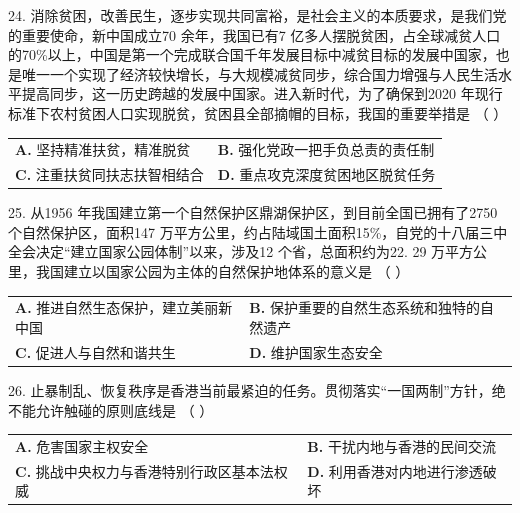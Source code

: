 \documentclass[UTF8,11pt]{ctexart}
\begin{document}
24. 消除贫困，改善民生，逐步实现共同富裕，是社会主义的本质要求，是我们党的重要使命，新中国成立70 余年，我国已有7 亿多人摆脱贫困，占全球减贫人口的70\%以上，中国是第一个完成联合国千年发展目标中减贫目标的发展中国家，也是唯一一个实现了经济较快增长，与大规模减贫同步，综合国力增强与人民生活水平提高同步，这一历史跨越的发展中国家。进入新时代，为了确保到2020 年现行标准下农村贫困人口实现脱贫，贫困县全部摘帽的目标，我国的重要举措是 （    ）


\begin{center}\begin{tabular}{>{\raggedright\arraybackslash}p{\dimexpr(\linewidth-4\tabcolsep)/2\relax}>{\raggedright\arraybackslash}p{\dimexpr(\linewidth-4\tabcolsep)/2\relax}}
\textbf{A.} 坚持精准扶贫，精准脱贫 & \textbf{B.} 强化党政一把手负总责的责任制\\[.35em]
\textbf{C.} 注重扶贫同扶志扶智相结合 & \textbf{D.} 重点攻克深度贫困地区脱贫任务\\[.35em]\end{tabular}\end{center}

25. 从1956 年我国建立第一个自然保护区鼎湖保护区，到目前全国已拥有了2750 个自然保护区，面积147 万平方公里，约占陆域国土面积15\%，自党的十八届三中全会决定“建立国家公园体制”以来，涉及12 个省，总面积约为22. 29 万平方公里，我国建立以国家公园为主体的自然保护地体系的意义是 （    ）


\begin{center}\begin{tabular}{>{\raggedright\arraybackslash}p{\dimexpr(\linewidth-4\tabcolsep)/2\relax}>{\raggedright\arraybackslash}p{\dimexpr(\linewidth-4\tabcolsep)/2\relax}}
\textbf{A.} 推进自然生态保护，建立美丽新中国 & \textbf{B.} 保护重要的自然生态系统和独特的自然遗产\\[.35em]
\textbf{C.} 促进人与自然和谐共生 & \textbf{D.} 维护国家生态安全\\[.35em]\end{tabular}\end{center}

26. 止暴制乱、恢复秩序是香港当前最紧迫的任务。贯彻落实“一国两制”方针，绝不能允许触碰的原则底线是 （    ）


\begin{center}\begin{tabular}{>{\raggedright\arraybackslash}p{\dimexpr(\linewidth-4\tabcolsep)/2\relax}>{\raggedright\arraybackslash}p{\dimexpr(\linewidth-4\tabcolsep)/2\relax}}
\textbf{A.} 危害国家主权安全 & \textbf{B.} 干扰内地与香港的民间交流\\[.35em]
\textbf{C.} 挑战中央权力与香港特别行政区基本法权威 & \textbf{D.} 利用香港对内地进行渗透破坏\\[.35em]\end{tabular}\end{center}
\end{document}
